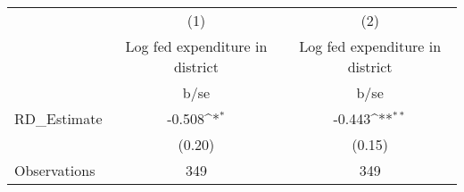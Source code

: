 {
\def\sym#1{\ifmmode^{#1}\else\(^{#1}\)\fi}
\begin{tabular}{l*{2}{c}}
\hline\hline
                    &\multicolumn{1}{c}{(1)}&\multicolumn{1}{c}{(2)}\\
                    &\multicolumn{1}{c}{Log fed expenditure in district }&\multicolumn{1}{c}{Log fed expenditure in district }\\
                    &        b/se         &        b/se         \\
\hline
RD\_Estimate         &      -0.508\sym{*}  &      -0.443\sym{**} \\
                    &      (0.20)         &      (0.15)         \\
\hline
Observations        &         349         &         349         \\
\hline\hline
\end{tabular}
}
